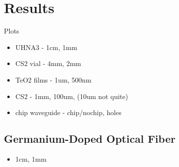 
\section{Results}
\label{sec:Raman:Results}

Plots
\begin{itemize}
  \item UHNA3 - 1cm, 1mm
  \item CS2 vial - 4mm, 2mm
  \item TeO2 films - 1um, 500nm
  \item CS2 - 1mm, 100um, (10um not quite)
  \item chip waveguide - chip/nochip, holes
\end{itemize}

\subsection{Germanium-Doped Optical Fiber}
\label{subsec:Raman:Target:UHNA3}

\begin{itemize}
  \item 1cm, 1mm
\end{itemize}

